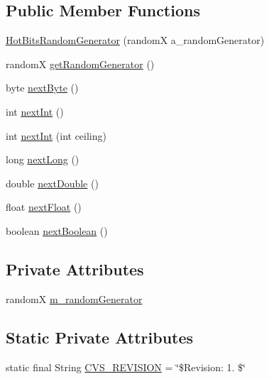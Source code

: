 \subsection*{Public Member Functions}
\begin{DoxyCompactItemize}
\item 
\hyperlink{classorg_1_1jgap_1_1impl_1_1_hot_bits_random_generator_a9e55f5cd47a861f70b051f86278a378c}{Hot\-Bits\-Random\-Generator} (random\-X a\-\_\-random\-Generator)
\item 
random\-X \hyperlink{classorg_1_1jgap_1_1impl_1_1_hot_bits_random_generator_a84bbb39c921d46f5cff77c8e6a5baabc}{get\-Random\-Generator} ()
\item 
byte \hyperlink{classorg_1_1jgap_1_1impl_1_1_hot_bits_random_generator_a5460b602a8d1fd5bf2c71ab972a973ab}{next\-Byte} ()
\item 
int \hyperlink{classorg_1_1jgap_1_1impl_1_1_hot_bits_random_generator_a212886b62617d156a8dfaa8753ab1ae9}{next\-Int} ()
\item 
int \hyperlink{classorg_1_1jgap_1_1impl_1_1_hot_bits_random_generator_ad532bb61610054a88c7a46633937f62f}{next\-Int} (int ceiling)
\item 
long \hyperlink{classorg_1_1jgap_1_1impl_1_1_hot_bits_random_generator_a084ac095168363d42c9b581475b314b4}{next\-Long} ()
\item 
double \hyperlink{classorg_1_1jgap_1_1impl_1_1_hot_bits_random_generator_a21342093908fb90520d7506d0bec49f0}{next\-Double} ()
\item 
float \hyperlink{classorg_1_1jgap_1_1impl_1_1_hot_bits_random_generator_a4d60bfea27c1cf66d355c2608091cc30}{next\-Float} ()
\item 
boolean \hyperlink{classorg_1_1jgap_1_1impl_1_1_hot_bits_random_generator_aa660e3a60dca1802dbc28c564f2a9428}{next\-Boolean} ()
\end{DoxyCompactItemize}
\subsection*{Private Attributes}
\begin{DoxyCompactItemize}
\item 
random\-X \hyperlink{classorg_1_1jgap_1_1impl_1_1_hot_bits_random_generator_afb3d4f751eec2635618aee7d91323a63}{m\-\_\-random\-Generator}
\end{DoxyCompactItemize}
\subsection*{Static Private Attributes}
\begin{DoxyCompactItemize}
\item 
static final String \hyperlink{classorg_1_1jgap_1_1impl_1_1_hot_bits_random_generator_a902b9dbe4496da72c6c3807a0c266523}{C\-V\-S\-\_\-\-R\-E\-V\-I\-S\-I\-O\-N} = \char`\"{}\$Revision\-: 1. \$\char`\"{}
\end{DoxyCompactItemize}
